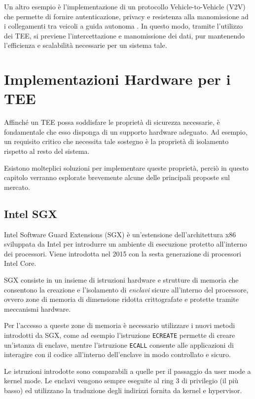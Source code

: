 \documentclass[12pt,italian]{report}
\begin{document}
	\bigbreak
	
	Un altro esempio è l'implementazione di un protocollo Vehicle-to-Vehicle (V2V) che permette di fornire autenticazione, privacy e resistenza alla manomissione ad i collegamenti tra veicoli a guida autonoma \cite{teeuses_vehicles}. In questo modo, tramite l'utilizzo dei TEE, si previene l'intercettazione e manomissione dei dati, pur mantenendo l'efficienza e scalabilità necessarie per un sistema tale.
	
	\newpage
	
	\section{Implementazioni Hardware per i TEE}
	\label{sec:supporto-hw}
	Affinché un TEE possa soddisfare le proprietà di sicurezza necessarie, è fondamentale che esso disponga di un supporto hardware adeguato. Ad esempio, un requisito critico che necessita tale sostegno è la proprietà di isolamento rispetto al resto del sistema.
	
	Esistono molteplici soluzioni per implementare queste proprietà, perciò in questo capitolo verranno esplorate brevemente alcune delle principali proposte sul mercato.
	
	\subsection{Intel SGX}
	\label{subsec:sgx}
	Intel Software Guard Extensions (SGX) è un'estensione dell'architettura x86 sviluppata da Intel per introdurre un ambiente di esecuzione protetto all'interno dei processori. Viene introdotta nel 2015 con la sesta generazione di processori Intel Core.
	
	SGX consiste in un insieme di istruzioni hardware e strutture di memoria che consentono la creazione e l'isolamento di \textit{enclavi} sicure all'interno del processore, ovvero zone di memoria di dimensione ridotta crittografate e protette tramite meccanismi hardware. 
	
	Per l'accesso a queste zone di memoria è necessario utilizzare i nuovi metodi introdotti da SGX, come ad esempio l'istruzione \texttt{ECREATE} permette di creare un'istanza di enclave, mentre l'istruzione \texttt{ECALL} consente alle applicazioni di interagire con il codice all'interno dell'enclave in modo controllato e sicuro. 
	
	Le istruzioni introdotte sono comparabili a quelle per il passaggio da user mode a kernel mode. Le enclavi vengono sempre eseguite al ring 3 di privilegio (il più basso) ed utilizzano la traduzione degli indirizzi fornita da kernel e hypervisor.
	
\end{document}
